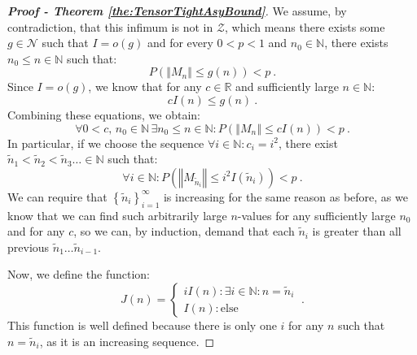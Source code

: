 \documentclass{article} %
\begin{document}
\begin{proof}[\textbf{Proof - Theorem \ref{the:TensorTightAsyBound}}]
We assume, by contradiction, that this infimum is not in \(\mathcal{Z}\), which means there exists some \(g\in\mathcal{N}\) such that \(I=o(g)\) and for every \(0<p<1\) and \(n_0\in\mathbb{N}\), there exists \(n_0\leq n\in\mathbb{N}\) such that:
\begin{equation}
P\left(\left\Vert M_n\right\Vert \leq g\left(n\right)\right)<p \ .
\label{eq:Zin:Fllin}
\end{equation}
Since \(I=o(g)\), we know that for any \(c\in\mathbb{R}\) and sufficiently large \(n\in\mathbb{N}\):
\begin{equation}
    cI\left(n\right)\leq g\left(n\right) \ .
\end{equation}
Combining these equations, we obtain:
\begin{equation}
\forall 0<c,\,n_{0}\in\mathbb{N}\,\exists n_{0}\leq n\in\mathbb{N}:P\left(\left\Vert M_n\right\Vert \leq cI\left(n\right)\right)<p \ .
\end{equation}
In particular, if we choose the sequence \(\forall i\in\mathbb{N}:c_i=i^2\), there exist \(\tilde{n}_1<\tilde{n}_2<\tilde{n}_3\ldots\in\mathbb{N}\) such that:
\begin{equation}
    \forall i\in\mathbb{N}:P\left(\left\Vert M_{\tilde{n}_i}\right\Vert \leq i^2I\left(\tilde{n}_{i}\right)\right)<p \ .
    \label{eq:Zin:Arucha1}
\end{equation}
We can require that \(\left\{ \tilde{n}_{i}\right\} _{i=1}^{\infty}\) is increasing for the same reason as before, as we know that we can find such arbitrarily large \(n\)-values for any sufficiently large \(n_0\) and for any \(c\), so we can, by induction, demand that each \(\tilde{n}_i\) is greater than all previous \(\tilde{n}_1\ldots\tilde{n}_{i-1}\).

Now, we define the function:
\begin{equation}
J\left(n\right)=\left\{ \begin{array}{c}
iI\left(n\right):\exists i\in\mathbb{N}:n=\tilde{n}_{i}\\
I\left(n\right):\text{else}
\end{array}\right. \ .
\label{eq:Zin:Arucha2}
\end{equation}
This function is well defined because there is only one \(i\) for any \(n\) such that \(n=\tilde{n}_i\), as it is an increasing sequence.


\end{proof}
\end{document}

